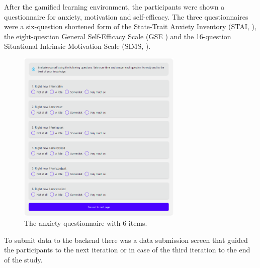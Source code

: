 After the gamified learning environment, the participants were shown a questionnaire for anxiety, motivation and self-efficacy.
The three questionnaires were a six-question shortened form of the State-Trait Anxiety Inventory (STAI, \textcite{marteauDevelopmentSixitemShortform1992}), the eight-question General Self-Efficacy Scale (GSE \textcite{guayAssessmentSituationalIntrinsic2000}) and the 16-question Situational Intrinsic Motivation Scale (SIMS, \textcite{chenValidationNewGeneral2001}).
\begin{figure}[H]
  \centering
  \includegraphics[width=0.7\textwidth]{img/Stai.png}
  \caption{The anxiety questionnaire with 6 items.}
  \label{fig:figureAnxiety}
\end{figure}
To submit data to the backend there was a data submission screen that guided the participants to the next iteration or in case of the third iteration to the end of the study.
\newpage
